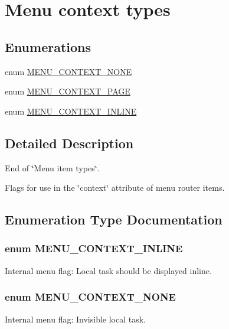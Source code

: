 \hypertarget{group__menu__context__types}{
\section{Menu context types}
\label{group__menu__context__types}
}
\subsection*{Enumerations}
\begin{DoxyCompactItemize}
\item 
enum \hyperlink{group__menu__context__types_ga19f4a6560ff590fbd049b4bcccf0a928}{MENU\_\-CONTEXT\_\-NONE} 
\item 
enum \hyperlink{group__menu__context__types_gaf4e86a5b19191e3dcad0257912df38cf}{MENU\_\-CONTEXT\_\-PAGE} 
\item 
enum \hyperlink{group__menu__context__types_gad814d6900713af2b410c9d347462b923}{MENU\_\-CONTEXT\_\-INLINE} 
\end{DoxyCompactItemize}


\subsection{Detailed Description}
End of \char`\"{}Menu item types\char`\"{}.

Flags for use in the \char`\"{}context\char`\"{} attribute of menu router items. 

\subsection{Enumeration Type Documentation}
\hypertarget{group__menu__context__types_gad814d6900713af2b410c9d347462b923}{
\subsubsection[{MENU\_\-CONTEXT\_\-INLINE}]{\setlength{\rightskip}{0pt plus 5cm}enum {\bf MENU\_\-CONTEXT\_\-INLINE}}}
\label{group__menu__context__types_gad814d6900713af2b410c9d347462b923}
Internal menu flag: Local task should be displayed inline. \hypertarget{group__menu__context__types_ga19f4a6560ff590fbd049b4bcccf0a928}{
\subsubsection[{MENU\_\-CONTEXT\_\-NONE}]{\setlength{\rightskip}{0pt plus 5cm}enum {\bf MENU\_\-CONTEXT\_\-NONE}}}
\label{group__menu__context__types_ga19f4a6560ff590fbd049b4bcccf0a928}
Internal menu flag: Invisible local task.

